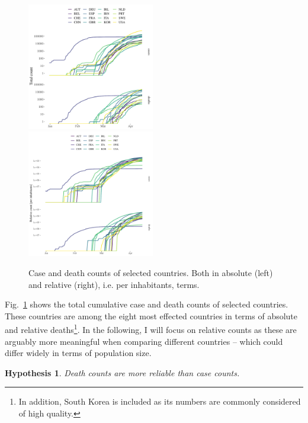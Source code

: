 \documentclass[fullpage,a4paper]{article}
\newcommand{\fig}[1]{Fig.~\ref{fig:#1}}
\newtheorem{hypothesis}{Hypothesis}
\begin{document}
\begin{figure}
  \includegraphics[width=0.495\textwidth]{../figs/ecdc_raw_absolute.pdf}
  \includegraphics[width=0.495\textwidth]{../figs/ecdc_raw_relative.pdf}
  \caption{\label{fig:raw_data} Case and death counts of selected
    countries. Both in absolute (left) and relative (right), i.e. per
    inhabitants, terms.}
\end{figure}
\fig{raw_data} shows the total cumulative case and death counts of
selected countries. These countries are among the eight most effected
countries in terms of absolute and relative deaths\footnote{In
  addition, South Korea is included as its numbers are commonly
  considered of high quality.}. In the following, I will focus on
relative counts as these are arguably more meaningful when comparing
different countries -- which could differ widely in terms of
population size.

\begin{hypothesis}
  \label{hyp:count}
  Death counts are more reliable than case counts.
\end{hypothesis}
\end{document}
